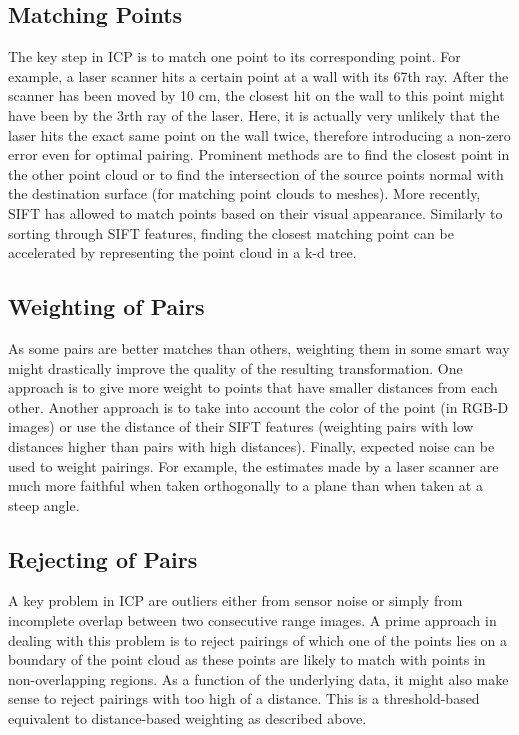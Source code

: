 \documentclass[paper=6.14in:9.21in,pagesize=pdftex,11pt,twoside,openright]{scrbook}
\begin{document}
\subsection{Matching Points}
The key step in ICP is to match one point to its corresponding point.  For example, a laser scanner hits a certain point at a wall with its 67th ray. After the scanner has been moved by 10 cm, the closest hit on the wall to this point might have been by the 3rth ray of the laser. Here, it is actually very unlikely that the laser hits the exact same point on the wall twice, therefore introducing a non-zero error even for optimal pairing. Prominent methods are to find the closest point in the other point cloud or to find the intersection of the source points normal with the destination surface (for matching point clouds to meshes). More recently, SIFT has allowed to match points based on their visual appearance. Similarly to sorting through SIFT features, finding the closest matching point can be accelerated by representing the point cloud in a k-d tree.

\subsection{Weighting of Pairs}
As some pairs are better matches than others, weighting them in some smart way might drastically improve the quality of the resulting transformation. One approach is to give more weight to points that have smaller distances from each other. Another approach is to take into account the color of the point (in RGB-D images) or use the distance of their SIFT features (weighting pairs with low distances higher than pairs with high distances). Finally, expected noise can be used to weight pairings. For example, the estimates made by a laser scanner are much more faithful when taken orthogonally to a plane than when taken at a steep angle.

\subsection{Rejecting of Pairs}
A key problem in ICP are outliers either from sensor noise or simply from incomplete overlap between two consecutive range images. A prime approach in dealing with this problem is to reject pairings of which one of the points lies on a boundary of the point cloud as these points are likely to match with points in non-overlapping regions. As a function of the underlying data, it might also make sense to reject pairings with too high of a distance. This is a threshold-based equivalent to distance-based weighting as described above.
\end{document}
